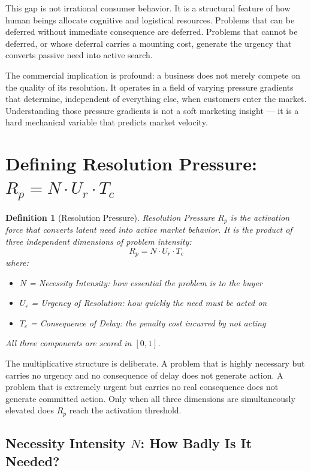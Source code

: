 \documentclass[12pt, openany]{book}
\theoremstyle{thmstyle}
\theoremstyle{defstyle}
\newtheorem{definition}{Definition}[chapter]
\begin{document}
This gap is not irrational consumer behavior. It is a structural feature of how human beings allocate cognitive and logistical resources. Problems that can be deferred without immediate consequence are deferred. Problems that cannot be deferred, or whose deferral carries a mounting cost, generate the urgency that converts passive need into active search.

The commercial implication is profound: a business does not merely compete on the quality of its resolution. It operates in a field of varying pressure gradients that determine, independent of everything else, when customers enter the market. Understanding those pressure gradients is not a soft marketing insight --- it is a hard mechanical variable that predicts market velocity.

\section{Defining Resolution Pressure: $R_p = N \cdot U_r \cdot T_c$}

\begin{definition}[Resolution Pressure]
Resolution Pressure $R_p$ is the activation force that converts latent need into active market behavior. It is the product of three independent dimensions of problem intensity:
\begin{equation}
R_p = N \cdot U_r \cdot T_c
\label{eq:rp}
\end{equation}
where:
\begin{itemize}[leftmargin=1.5em]
  \item $N$ = Necessity Intensity: how essential the problem is to the buyer
  \item $U_r$ = Urgency of Resolution: how quickly the need must be acted on
  \item $T_c$ = Consequence of Delay: the penalty cost incurred by not acting
\end{itemize}
All three components are scored in $[0, 1]$.
\end{definition}

The multiplicative structure is deliberate. A problem that is highly necessary but carries no urgency and no consequence of delay does not generate action. A problem that is extremely urgent but carries no real consequence does not generate committed action. Only when all three dimensions are simultaneously elevated does $R_p$ reach the activation threshold.

\subsection{Necessity Intensity $N$: How Badly Is It Needed?}
\end{document}
